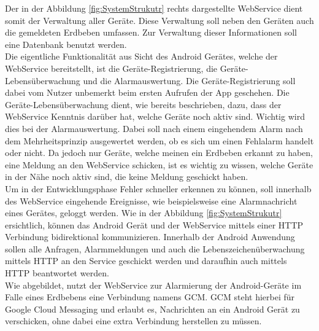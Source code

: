 Der in der Abbildung \ref{fig:SystemStrukutr} rechts dargestellte WebService dient somit der Verwaltung aller Geräte. Diese Verwaltung soll neben den Geräten auch die gemeldeten Erdbeben umfassen. Zur Verwaltung dieser Informationen soll eine Datenbank benutzt werden.\\
Die eigentliche Funktionalität aus Sicht des Android Gerätes, welche der WebService bereitstellt, ist die Geräte-Registrierung, die Geräte-Lebensüberwachung und die Alarmauswertung. Die Geräte-Registrierung soll dabei vom Nutzer unbemerkt beim ersten Aufrufen der App geschehen. Die Geräte-Lebensüberwachung dient, wie bereits beschrieben, dazu, dass der WebService Kenntnis darüber hat, welche Geräte noch aktiv sind. Wichtig wird dies bei der Alarmauswertung. Dabei soll nach einem eingehendem Alarm nach dem Mehrheitsprinzip ausgewertet werden, ob es sich um einen Fehlalarm handelt oder nicht. Da jedoch nur Geräte, welche meinen ein Erdbeben erkannt zu haben, eine Meldung an den WebService schicken, ist es wichtig zu wissen, welche Geräte in der Nähe noch aktiv sind, die keine Meldung geschickt haben.\\
Um in der Entwicklungsphase Fehler schneller erkennen zu können, soll innerhalb des WebService eingehende Ereignisse, wie beispielsweise eine Alarmnachricht eines Gerätes, geloggt werden. Wie in der Abbildung \ref{fig:SystemStrukutr} ersichtlich, können das Android Gerät und der WebService mittels einer HTTP Verbindung bidirektional kommunizieren. Innerhalb der Android Anwendung sollen alle Anfragen, Alarmmeldungen und auch die Lebenszeichenüberwachung mittels HTTP an den Service geschickt werden und daraufhin auch mittels HTTP beantwortet werden.\\
Wie abgebildet, nutzt der WebService zur Alarmierung der Android-Geräte im Falle eines Erdbebens eine Verbindung namens GCM. GCM steht hierbei für Google Cloud Messaging und erlaubt es, Nachrichten an ein Android Gerät zu verschicken, ohne dabei eine extra Verbindung herstellen zu müssen.
\newpage